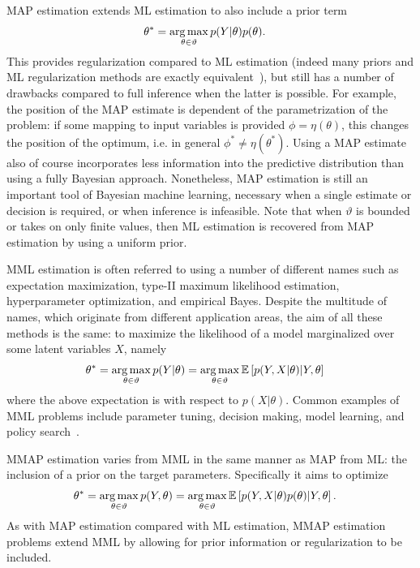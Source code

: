 MAP estimation extends ML estimation to also include a prior term
\begin{align}
\label{eq:opt:map}
\theta^* &= \operatorname*{arg\,max}_{\theta \in \vartheta} p(Y|\theta) p(\theta).	
\end{align}
This provides regularization compared to ML estimation (indeed many priors and
ML regularization methods are exactly equivalent~\citep{bishop2006pattern}),
but still has a number of drawbacks compared to full inference when the latter is
possible.  For example, the position of the MAP estimate is dependent of the
parametrization of the problem: if some mapping to input variables is
provided $\phi = \eta (\theta)$, this changes the position of the optimum, i.e.
in general $\phi^* \neq \eta (\theta^*)$.  Using a MAP estimate also of course
incorporates less information into the predictive distribution than using a
fully Bayesian approach.  Nonetheless, MAP estimation is still an important
tool of Bayesian machine learning, necessary when a single estimate or decision is required,
or when inference is infeasible.  Note that when $\vartheta$ is bounded or takes
on only finite values, then ML estimation is recovered from MAP estimation by using
a uniform prior.

MML estimation is often referred to using a number of different names such as expectation
maximization, type-II maximum likelihood estimation, hyperparameter optimization, and
empirical Bayes.  Despite the multitude of names, which originate from different application
areas, the aim of all these methods is the same: to maximize the likelihood of a model
marginalized over some latent variables $X$, namely
\begin{align}
	\label{eq:opt:MML}
	\theta^* &= \operatorname*{arg\,max}_{\theta \in \vartheta} p(Y|\theta) 
	= \operatorname*{arg\,max}_{\theta \in \vartheta} \mathbb{E} \left[p(Y,X|\theta) | Y, \theta\right]
\end{align}
where the above expectation is with respect to $p(X | \theta)$.  Common examples of MML
problems include parameter tuning, decision making, model learning, and policy search~\citep{deisenroth2013survey}.

MMAP estimation varies from MML in the same manner as MAP from ML: the inclusion
of a prior on the target parameters.  Specifically it aims to optimize
\begin{align}
\label{eq:opt:MMAP}
\theta^* &= \operatorname*{arg\,max}_{\theta \in \vartheta} p(Y,\theta) 
= \operatorname*{arg\,max}_{\theta \in \vartheta} \mathbb{E} \left[p(Y,X|\theta) p(\theta) | Y, \theta\right].
\end{align}
As with MAP estimation compared with ML estimation, 
MMAP estimation problems extend MML by allowing for prior information or regularization to be
included.

